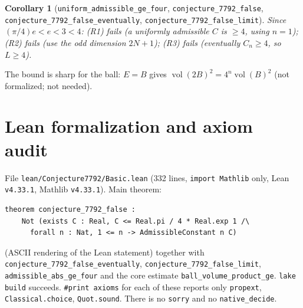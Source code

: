 \documentclass[11pt]{article}
\newtheorem{corollary}[theorem]{Corollary}
\theoremstyle{definition}
\newcommand{\vol}{\operatorname{vol}}
\begin{document}
\begin{corollary}[\texttt{uniform\_admissible\_ge\_four}, \texttt{conjecture\_7792\_false},
\texttt{conjecture\_7792\_false\_eventually}, \texttt{conjecture\_7792\_false\_limit}]
Since $(\pi/4)e<e<3<4$: (R1) fails (a uniformly admissible $C$ is $\ge4$, using $n=1$); (R2) fails
(use the odd dimension $2N+1$); (R3) fails (eventually $C_n\ge4$, so $L\ge4$).
\end{corollary}

The bound is sharp for the ball: $E=B$ gives $\vol(2B)^2=4^n\vol(B)^2$ (not formalized; not needed).

\section{Lean formalization and axiom audit}

File \texttt{lean/Conjecture7792/Basic.lean} (332 lines, \texttt{import Mathlib} only, Lean
\texttt{v4.33.1}, Mathlib \texttt{v4.33.1}). Main theorem:
\begin{verbatim}
theorem conjecture_7792_false :
    Not (exists C : Real, C <= Real.pi / 4 * Real.exp 1 /\
      forall n : Nat, 1 <= n -> AdmissibleConstant n C)
\end{verbatim}
(ASCII rendering of the Lean statement)
together with \texttt{conjecture\_7792\_false\_eventually},
\texttt{conjecture\_7792\_false\_limit}, \texttt{admissible\_abs\_ge\_four} and the core estimate
\texttt{ball\_volume\_product\_ge}. \texttt{lake build} succeeds. \texttt{\#print axioms} for each
of these reports only \texttt{propext}, \texttt{Classical.choice}, \texttt{Quot.sound}. There is
no \texttt{sorry} and no \texttt{native\_decide}.
\end{document}
